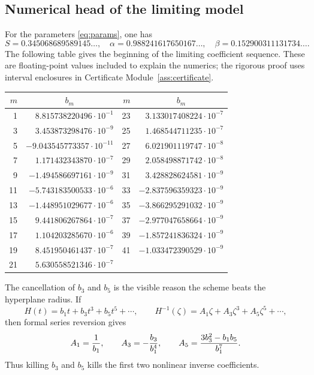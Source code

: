 \documentclass[11pt]{article}
\newcommand{\1}{\mathbf 1}
\theoremstyle{plain}
\theoremstyle{definition}
\theoremstyle{remark}
\begin{document}
\subsection{Numerical head of the limiting model}\label{subsec:numerical-head}

For the parameters \eqref{eq:params}, one has
\[
  S=0.345068689589145\ldots,
  \quad
  \alpha=0.988241617650167\ldots,
  \quad
  \beta=0.152900311131734\ldots .
\]
The following table gives the beginning of the limiting coefficient sequence.  These are floating-point values included to explain the numerics; the rigorous proof uses interval enclosures in Certificate Module~\ref{ass:certificate}.

\begin{center}
\small
\begin{tabular}{r r@{\qquad}r r}
\toprule
\(m\) & \multicolumn{1}{c}{\(b_m\)} & \(m\) & \multicolumn{1}{c}{\(b_m\)}\\
\midrule
1  & \( 8.815738220496\cdot10^{-1}\) & 23 & \( 3.133017408224\cdot10^{-7}\)\\
3  & \( 3.453873298476\cdot10^{-9}\) & 25 & \( 1.468544711235\cdot10^{-7}\)\\
5  & \(-9.043545773357\cdot10^{-11}\) & 27 & \( 6.021901119747\cdot10^{-8}\)\\
7  & \( 1.171432343870\cdot10^{-7}\) & 29 & \( 2.058498871742\cdot10^{-8}\)\\
9  & \(-1.494586697161\cdot10^{-9}\) & 31 & \( 3.428828624581\cdot10^{-9}\)\\
11 & \(-5.743183500533\cdot10^{-6}\) & 33 & \(-2.837596359323\cdot10^{-9}\)\\
13 & \(-1.448951029677\cdot10^{-6}\) & 35 & \(-3.866295291032\cdot10^{-9}\)\\
15 & \( 9.441806267864\cdot10^{-7}\) & 37 & \(-2.977047658664\cdot10^{-9}\)\\
17 & \( 1.104203285670\cdot10^{-6}\) & 39 & \(-1.857241836324\cdot10^{-9}\)\\
19 & \( 8.451950461437\cdot10^{-7}\) & 41 & \(-1.033472390529\cdot10^{-9}\)\\
21 & \( 5.630558521346\cdot10^{-7}\) & & \\
\bottomrule
\end{tabular}
\end{center}

The cancellation of \(b_3\) and \(b_5\) is the visible reason the scheme beats the hyperplane radius.  If
\[
  H(t)=b_1t+b_3t^3+b_5t^5+\cdots,
  \qquad
  H^{-1}(\zeta)=A_1\zeta+A_3\zeta^3+A_5\zeta^5+\cdots,
\]
then formal series reversion gives
\begin{equation}\label{eq:low-inverse}
  A_1={1\over b_1},
  \qquad
  A_3=-{b_3\over b_1^4},
  \qquad
  A_5={3b_3^2-b_1b_5\over b_1^7}.
\end{equation}
Thus killing \(b_3\) and \(b_5\) kills the first two nonlinear inverse coefficients.
\end{document}
